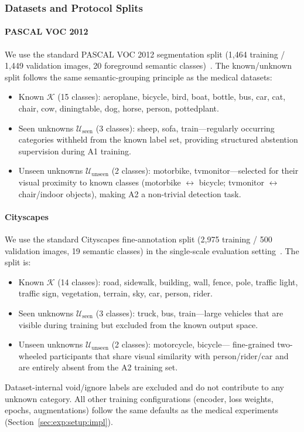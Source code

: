 \documentclass[3p,twocolumn,authoryear]{elsarticle}
\newcommand{\cK}{\mathcal{K}}                             %
\newcommand{\cU}{\mathcal{U}}                             %
\begin{document}
\subsubsection{Datasets and Protocol Splits}\label{sec:exp:crossdomain:data}

\paragraph{PASCAL VOC 2012}
We use the standard PASCAL VOC 2012 segmentation split (1,464 training / 1,449 validation
images, 20 foreground semantic classes)~\cite{everingham2010pascal}.
The known/unknown split follows the same semantic-grouping principle as the medical
datasets:
\begin{itemize}[nosep]
  \item Known $\cK$ (15 classes): aeroplane, bicycle, bird, boat, bottle, bus, car, cat,
        chair, cow, diningtable, dog, horse, person, pottedplant.
  \item Seen unknowns $\cU_{\text{seen}}$ (3 classes): sheep, sofa, train---regularly
        occurring categories withheld from the known label set, providing structured
        abstention supervision during A1 training.
  \item Unseen unknowns $\cU_{\text{unseen}}$ (2 classes): motorbike, tvmonitor---selected
        for their visual proximity to known classes (motorbike $\leftrightarrow$ bicycle;
        tvmonitor $\leftrightarrow$ chair/indoor objects), making A2 a non-trivial
        detection task.
\end{itemize}

\paragraph{Cityscapes}
We use the standard Cityscapes fine-annotation split (2,975 training / 500 validation
images, 19 semantic classes) in the single-scale evaluation setting~\cite{cordts2016cityscapes}.
The split is:
\begin{itemize}[nosep]
  \item Known $\cK$ (14 classes): road, sidewalk, building, wall, fence, pole,
        traffic light, traffic sign, vegetation, terrain, sky, car, person, rider.
  \item Seen unknowns $\cU_{\text{seen}}$ (3 classes): truck, bus, train---large
        vehicles that are visible during training but excluded from the known output space.
  \item Unseen unknowns $\cU_{\text{unseen}}$ (2 classes): motorcycle, bicycle---
        fine-grained two-wheeled participants that share visual similarity with
        person/rider/car and are entirely absent from the A2 training set.
\end{itemize}
Dataset-internal void/ignore labels are excluded and do not contribute to any
unknown category.
All other training configurations (encoder, loss weights, epochs, augmentations)
follow the same defaults as the medical experiments (Section~\ref{sec:exp:setup:impl}).
\end{document}
